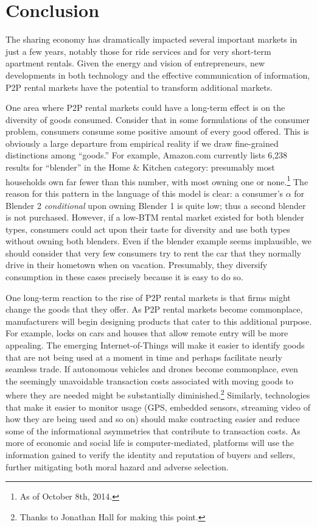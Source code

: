 \documentclass[11pt]{article}
\begin{document}
\section{Conclusion} 

The sharing economy has dramatically impacted several important markets in just a few years, notably those for ride services and for very short-term apartment rentals.
Given the energy and vision of entrepreneurs, new developments in both technology and the effective communication of information, P2P rental markets have the potential to transform additional markets.

One area where P2P rental markets could have a long-term effect is on the diversity of goods consumed. 
Consider that in some formulations of the consumer problem, consumers consume some positive amount of every good offered.
This is obviously a large departure from empirical reality if we draw fine-grained distinctions among ``goods.'' 
For example, Amazon.com currently lists 6,238 results for ``blender'' in the Home \& Kitchen category: 
presumably most households own far fewer than this number, with most owning one or none.\footnote{As of October 8th, 2014.}
The reason for this pattern in the language of this model is clear: 
a consumer's $\alpha$ for Blender 2 \emph{conditional} upon owning Blender 1 is quite low;
thus a second blender is not purchased.
However, if a low-BTM rental market existed for both blender types, consumers could act upon their taste for diversity and use both types without owning both blenders. 
Even if the blender example seems implausible, we should consider that very few consumers try to rent the car that they normally drive in their hometown when on vacation. 
Presumably, they diversify consumption in these cases precisely because it is easy to do so. 

One long-term reaction to the rise of P2P rental markets is that firms might change the goods that they offer. 
As P2P rental markets become commonplace, manufacturers will begin designing products that cater to this additional purpose. 
For example, locks on cars and houses that allow remote entry will be more appealing. 
The emerging Internet-of-Things will make it easier to identify goods that are not being used at a moment in time and perhaps facilitate nearly seamless trade.
If autonomous vehicles and drones become commonplace, even the seemingly unavoidable transaction costs associated with moving goods to where they are needed might be substantially diminished.\footnote{
  Thanks to Jonathan Hall for making this point.
}
Similarly, technologies that make it easier to monitor usage (GPS, embedded sensors, streaming video of how they are being used and so on) should make contracting easier and reduce some of the informational asymmetries that contribute to transaction costs. 
As more of economic and social life is computer-mediated, platforms will use the information gained to verify the identity and reputation of buyers and sellers, further mitigating both moral hazard and adverse selection.  
\end{document}

